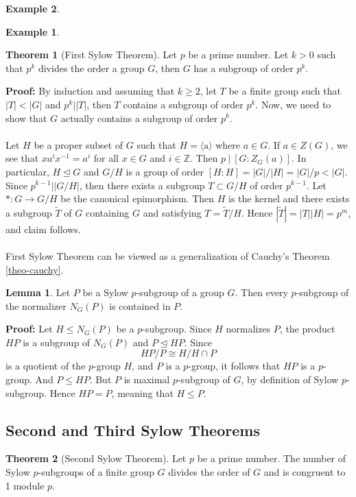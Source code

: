 \documentclass[11pt]{amsbook}%
\theoremstyle{plain}
\theoremstyle{definition}
\newtheorem*{example*}{Example}
\newtheorem{lemma}{Lemma}
\newtheorem{theorem}{Theorem}
\numberwithin{equation}{section}
\newcommand{\ZZ}{\mathbb Z}
\renewcommand{\proof}{ \textbf{Proof: }}
\newcommand{\lrangle}[1]{\langle \text{#1} \rangle}
\newcommand{\leftnormal}{\trianglelefteq}
\begin{document}
\begin{example*}
\begin{example*}
\begin{theorem}[First Sylow Theorem]
  \label{theo-first-sylow}
  Let $p$ be a prime number. Let $k > 0$ such that $p^{k}$ divides
  the order a group $G$, then $G$ has a subgroup of order $p^{k}$.
\end{theorem} \vspace{1.8em}
\proof By induction and assuming that $k \geq 2$, let $T$ be a finite group
such that $|T| < |G|$ and $p^{k}||T|$, then $T$ contains a subgroup of 
order $p^{k}$. Now, we need to show that $G$ actually contains a subgroup
of order $p^{k}$. \\ \\
Let $H$ be a proper subset of $G$ such that $H = \lrangle{a}$ where
$a \in G$. If $a \in Z(G)$, we see that $xa^{i}x^{-1} = a^{i}$ for all $x \in G$ and $i \in \ZZ$.
Then $p \ | \ [G:Z_{G}(a)]$. In particular,  $H \leftnormal G$ and $G/H$
is a group of order $[H:H] = |G|/|H| = |G|/p < |G|$. Since $p^{k-1}| |G/H|$,
then there exists a subgroup $T \subset G/H$ of order $p^{k-1}$.
Let $*: G \longrightarrow G/H$ be the canonical epimorphism. Then $H$ is the 
kernel and there exists a subgroup $\tilde{T}$ of $G$ containing $G$ and
satisfying $T = \tilde{T}/H$. Hence $|\tilde{T}| = |T||H| = p^{m}$, and claim follows. \qedsymbol \\ \\
First Sylow Theorem can be viewed as a generalization of Cauchy's Theorem \ref{theo-cauchy}.

\begin{lemma}
  Let $P$ be a Sylow $p$-subgroup of a group $G$. Then every $p$-subgroup of the normalizer $N_{G}(P)$
  is contained in $P$.
\end{lemma} \vspace{1.8em}
\proof Let $H \leq N_{G}(P)$ be a $p$-subgroup. Since $H$ normalizes $P$, the product $HP$ is
a subgroup of $N_{G}(P)$ and $P \leftnormal HP$. Since
$$
HP/P \cong H/H \cap P
$$
is a quotient of the $p$-group $H$, and $P$ is a $p$-group, it follows that $HP$ is a $p$-group.
And $P \leq HP$. But $P$ is maximal $p$-subgroup of $G$, by definition of Sylow
$p$-subgroup. Hence $HP = P$, meaning that $H \leq P$. \qedsymbol

\subsection{Second and Third Sylow Theorems}
\begin{theorem}[Second Sylow Theorem]
  \label{theo-second-sylow}
  Let $p$ be a prime number. The number of Sylow $p$-subgroups of a finite group $G$
  divides the order of $G$ and is congruent to 1 module $p$.
\end{theorem} 


\end{example*}
\end{example*}
\end{document}
